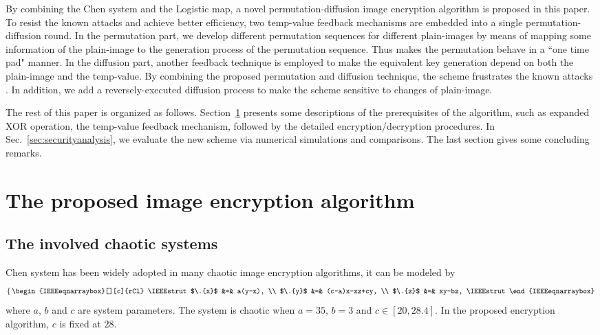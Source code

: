 \documentclass[3p,preprint,11pt]{elsarticle}
\begin{document}
By combining the Chen system and the Logistic map, a novel permutation-diffusion image encryption algorithm
is proposed in this paper.
To resist the known attacks and achieve better efficiency, two temp-value feedback mechanisms are embedded into
a single permutation-diffusion round.
In the permutation part, we develop different permutation sequences for different plain-images
by means of mapping some information of the plain-image to the generation process of the permutation sequence.
Thus makes the permutation behave in a ``one time pad" manner.
In the diffusion part, another feedback technique is employed to make the
equivalent key generation depend on both the plain-image and the temp-value. By combining the proposed
permutation and diffusion technique, the scheme frustrates the known attacks \cite{Solak:AnalyFridrich:IJBC10,
Chengqing:AnalysisFridrichstructure:IEEECirSys08}.
In addition, we add a reversely-executed diffusion process to make the scheme sensitive to changes of plain-image.




The rest of this paper is organized as follows. Section~\ref{sec:scheme} presents some descriptions
of the prerequisites of the algorithm, such as expanded XOR operation, the temp-value feedback mechanism,
followed by the detailed encryption/decryption procedures.
In Sec.~\ref{sec:securityanalysis}, we evaluate the new scheme via
numerical simulations and comparisons. The last section gives some concluding remarks.



\section{The proposed image encryption algorithm}
\label{sec:scheme}
\subsection{The involved chaotic systems}
Chen system has been widely adopted in many chaotic image encryption algorithms, it can be modeled
by \cite{Chen:3DChaoticCipher:CSF04}
\begin{equation}
\left\{\,
\begin{IEEEeqnarraybox}[][c]{rCl}
\IEEEstrut
$\.{x}$ &=& a(y-x), \\
$\.{y}$ &=& (c-a)x-xz+cy, \\
$\.{z}$ &=& xy-bz,
\IEEEstrut
\end{IEEEeqnarraybox}
\right.
\label{eq:chensystem}
\end{equation}
where $a$, $b$ and $c$ are system parameters. The system is chaotic when $a=35$, $b=3$ and $c \in [20, 28.4]$.
In the proposed encryption algorithm, $c$ is fixed at $28$.
\end{document}
